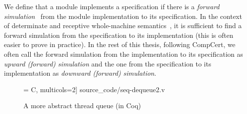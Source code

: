 We define that a module implements a specification if there is a
{\em forward simulation}~\cite{Lynch95} 
from the module implementation to its
specification. In the context of determinate and receptive 
whole-machine semantics~\cite{sevcik13,Leroy-backend},
it is sufficient to find
a forward simulation from the specification to its
implementation (this is often easier to prove in practice). 
In the rest of this thesis, following CompCert, we often call the
forward simulation from the implementation to its specification
as {\em upward (forward) simulation} and the one from the specification
to its implementation as {\em downward (forward) simulation}.

\begin{figure}\centering
 = C, multicols=2] {source_code/seq-dequeue2.v}
\caption{A more abstract thread queue (in Coq) }
\label{fig:queue2}
\end{figure}

\ignore{
\begin{figure}[t]\scriptsize
$$
\begin{array}{l|l}
\hspace*{-2ex} 
\begin{array}[t]{l}
\verb+Definition tcb := td_state.+\\
\verb++\\
\verb+Definition tdq := List Z.+\\
\verb++\\
\verb+Record abs':={tcbp:ZMap.t tcb;+\\
\verb+              tdqp:ZMap.t tdq}+\\
\end{array}
&
\begin{array}[t]{l}
\verb+Function + \hat{\sigma}_\textsf{dequeue}' \verb+ a i :=+\\ 
\verb+match (a.tdqp i) with+\\
\verb+| h :: q' =>+\\
\verb+  Some(set_tdq a i q', h)+\\
\verb+| nil => None+\\
\verb+end ......+\\
\end{array}
\end{array}
$$ 
\caption{A more abstract queue (in Coq)}
\label{fig:queue2}
\end{figure}
}

